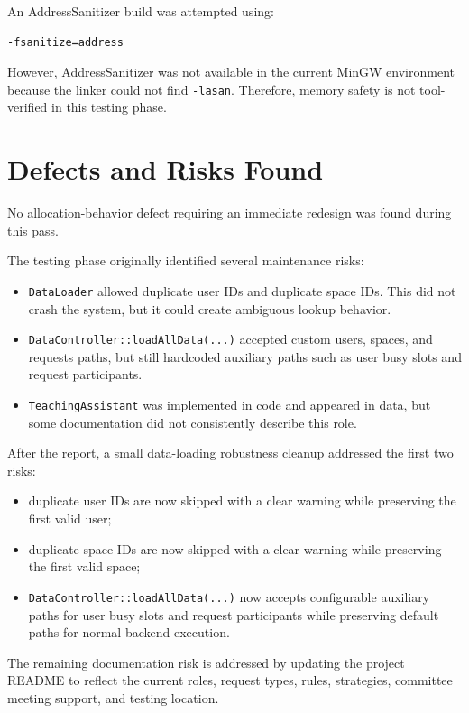 \documentclass[12pt,a4paper]{article}
\begin{document}
An AddressSanitizer build was attempted using:

\begin{verbatim}
-fsanitize=address
\end{verbatim}

However, AddressSanitizer was not available in the current MinGW environment because the linker could not find \texttt{-lasan}. Therefore, memory safety is not tool-verified in this testing phase.

\section{Defects and Risks Found}

No allocation-behavior defect requiring an immediate redesign was found during this pass.

The testing phase originally identified several maintenance risks:

\begin{itemize}
    \item \texttt{DataLoader} allowed duplicate user IDs and duplicate space IDs. This did not crash the system, but it could create ambiguous lookup behavior.
    \item \texttt{DataController::loadAllData(...)} accepted custom users, spaces, and requests paths, but still hardcoded auxiliary paths such as user busy slots and request participants.
    \item \texttt{TeachingAssistant} was implemented in code and appeared in data, but some documentation did not consistently describe this role.
\end{itemize}

After the report, a small data-loading robustness cleanup addressed the first two risks:

\begin{itemize}
    \item duplicate user IDs are now skipped with a clear warning while preserving the first valid user;
    \item duplicate space IDs are now skipped with a clear warning while preserving the first valid space;
    \item \texttt{DataController::loadAllData(...)} now accepts configurable auxiliary paths for user busy slots and request participants while preserving default paths for normal backend execution.
\end{itemize}

The remaining documentation risk is addressed by updating the project README to reflect the current roles, request types, rules, strategies, committee meeting support, and testing location.
\end{document}
